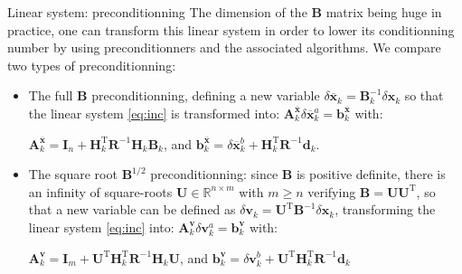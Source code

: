\documentclass[10pt]{beamer}
\begin{document}
\begin{frame}{Linear system: preconditionning}
 The dimension of the $\mathbf{B}$ matrix being huge in practice, one can transform this linear system in order to lower its conditionning number by using preconditionners and the associated algorithms. We compare two types of preconditionning:
 \vspace{+0.3cm}
 \begin{itemize}
  \item The full $\mathbf{B}$ preconditionning, defining a new variable $\delta \overline{\mathbf{x}}_k = \mathbf{B}_k^{-1} \delta \mathbf{x}_k$ so that the linear system \eqref{eq:inc} is transformed into: $\boxed{\mathbf{A}^{\overline{\mathbf{x}}}_k \delta \overline{\mathbf{x}}^a_k = \mathbf{b}^{\overline{\mathbf{x}}}_k}$ with:\\
  \begin{center}
  $\mathbf{A}^{\overline{\mathbf{x}}}_k = \mathbf{I}_n + \mathbf{H}_k^\mathrm{T} \mathbf{R}^{-1} \mathbf{H}_k \mathbf{B}_k$, and $\mathbf{b}^{\overline{\mathbf{x}}}_k =  \delta \overline{\mathbf{x}}^b_k + \mathbf{H}_k^\mathrm{T} \mathbf{R}^{-1} \mathbf{d}_k$.
  \end{center}
  \vspace{+0.3cm}
  \item The square root $\mathbf{B}^{1/2}$ preconditionning: since $\mathbf{B}$ is positive definite, there is an infinity of square-roots $\mathbf{U} \in \mathbb{R}^{n \times m}$ with $m \ge n$ verifying $\mathbf{B} = \mathbf{U} \mathbf{U}^\mathrm{T}$, so that a new variable can be defined as $\delta \mathbf{v}_k = \mathbf{U}^\mathrm{T} \mathbf{B}^{-1} \delta \mathbf{x}_k$, transforming the linear system \eqref{eq:inc} into: $\boxed{\mathbf{A}^\mathbf{v}_k \delta \mathbf{v}^a_k = \mathbf{b}^\mathbf{v}_k}$ with:\\
  \begin{center}
  $\mathbf{A}^\mathbf{v}_k = \mathbf{I}_m + \mathbf{U}^\mathrm{T} \mathbf{H}_k^\mathrm{T} \mathbf{R}^{-1} \mathbf{H}_k \mathbf{U}$, and $\mathbf{b}^\mathbf{v}_k = \delta \mathbf{v}^b_k + \mathbf{U}^\mathrm{T} \mathbf{H}_k^\mathrm{T} \mathbf{R}^{-1} \mathbf{d}_k$
  \end{center}
\end{itemize}
\end{frame}
\end{document}
